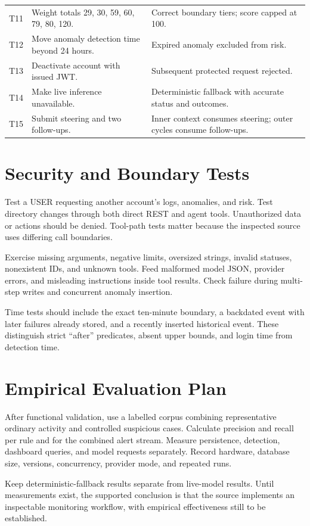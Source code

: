 \begin{longtable}{>{\raggedright\arraybackslash}p{0.9cm}>{\raggedright\arraybackslash}p{6.1cm}>{\raggedright\arraybackslash}p{7cm}}
T11 & Weight totals 29, 30, 59, 60, 79, 80, 120. & Correct boundary tiers; score capped at 100.\\
T12 & Move anomaly detection time beyond 24 hours. & Expired anomaly excluded from risk.\\
T13 & Deactivate account with issued JWT. & Subsequent protected request rejected.\\
T14 & Make live inference unavailable. & Deterministic fallback with accurate status and outcomes.\\
T15 & Submit steering and two follow-ups. & Inner context consumes steering; outer cycles consume follow-ups.\\\bottomrule
\end{longtable}
\endgroup

\section{Security and Boundary Tests}
Test a USER requesting another account's logs, anomalies, and risk. Test directory changes through both direct REST and agent tools. Unauthorized data or actions should be denied. Tool-path tests matter because the inspected source uses differing call boundaries.

Exercise missing arguments, negative limits, oversized strings, invalid statuses, nonexistent IDs, and unknown tools. Feed malformed model JSON, provider errors, and misleading instructions inside tool results. Check failure during multi-step writes and concurrent anomaly insertion.

Time tests should include the exact ten-minute boundary, a backdated event with later failures already stored, and a recently inserted historical event. These distinguish strict ``after'' predicates, absent upper bounds, and login time from detection time.

\section{Empirical Evaluation Plan}
After functional validation, use a labelled corpus combining representative ordinary activity and controlled suspicious cases. Calculate precision and recall per rule and for the combined alert stream. Measure persistence, detection, dashboard queries, and model requests separately. Record hardware, database size, versions, concurrency, provider mode, and repeated runs.

Keep deterministic-fallback results separate from live-model results. Until measurements exist, the supported conclusion is that the source implements an inspectable monitoring workflow, with empirical effectiveness still to be established.
